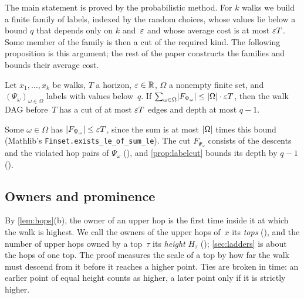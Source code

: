 The main statement is proved by the probabilistic method. For $k$ walks we build a finite family of labels, indexed by the
random choices, whose values lie below a bound $q$ that depends only on $k$ and~$\varepsilon$ and whose average cost is at most
$\varepsilon T$. Some member of the family is then a cut of the required kind. The following proposition is this argument; the rest
of the paper constructs the families and bounds their average cost.

\begin{proposition}\label{prop:avg}
Let $x_1,\dots,x_k$ be walks, $T$ a horizon, $\varepsilon\in\mathbb{R}$, $\Omega$ a nonempty finite set, and $(\Psi_\omega)_{\omega\in\Omega}$
labels with values below~$q$. If $\sum_{\omega\in\Omega}\lvert F_{\Psi_\omega} \rvert\le\lvert \Omega \rvert\cdot\varepsilon T$, then the walk DAG
before~$T$ has a cut of at most $\varepsilon T$ edges and depth at most $q-1$.
\end{proposition}

\begin{outline}
Some $\omega\in\Omega$ has $\lvert F_{\Psi_\omega} \rvert\le\varepsilon T$, since the sum is at most $\lvert \Omega \rvert$ times this bound
(Mathlib's \texttt{Finset.exists\_le\_of\_sum\_le}). The cut $F_{\Psi_\omega}$ consists of the descents and the violated hop
pairs of $\Psi_\omega$ (), and \cref{prop:labelcut} bounds its depth by $q-1$ ().
\end{outline}

\subsection{Owners and prominence}\label{sec:prelim-prom}

By \cref{lem:hops}(b), the owner of an upper hop is the first time inside it at which the walk is highest. We call the owners
of the upper hops of~$x$ its \emph{tops} (), and the number of upper hops owned by a top~$\tau$ its \emph{height}
$H_\tau$ (); \cref{sec:ladders} is about the hops of one top. The proof measures the scale of a top by how far the
walk must descend from it before it reaches a higher point. Ties are broken in time: an earlier point of equal height counts
as higher, a later point only if it is strictly higher.

